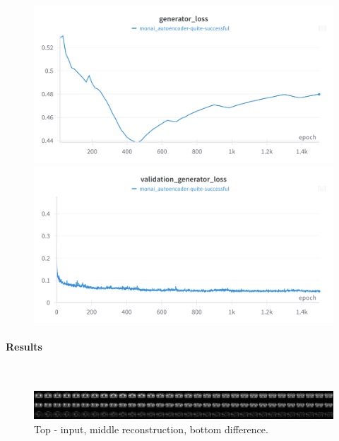 \begin{figure}[H]
\includegraphics[width=\linewidth]{detailed_engineering/Monai Autoencoder/charts/generator_loss.png}
\caption{}
\endminipage\hfill
{}
\includegraphics[width=\linewidth]{detailed_engineering/Monai Autoencoder/charts/val_generator_loss.png}
\caption{}
\endminipage
\end{figure}


\paragraph{Results}\mbox{}\\

\begin{figure}[H]
    \centering
    \includegraphics[width=\linewidth]{reports/monai_autoenc_comparison_full.png}
    \caption{Top - input, middle reconstruction, bottom difference.}
    \label{fig:enter-label}
\end{figure}

